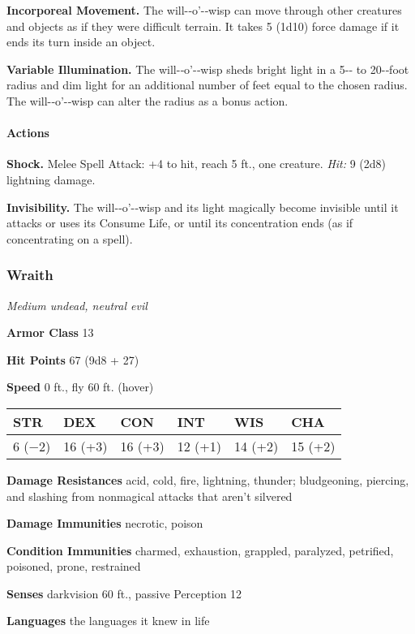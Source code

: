 \documentclass[
]{article}
\begin{document}
\textbf{Incorporeal Movement.} The will-­‐o'-­‐wisp can move through
other creatures and objects as if they were difficult terrain. It takes
5 (1d10) force damage if it ends its turn inside an object.

\textbf{Variable Illumination.} The will-­‐o'-­‐wisp sheds bright light
in a 5-­‐ to 20-­‐foot radius and dim light for an additional number of
feet equal to the chosen radius. The will-­‐o'-­‐wisp can alter the
radius as a bonus action.

\hypertarget{actions-1}{%
\paragraph{Actions}\label{actions-1}}

\textbf{Shock.} Melee Spell Attack: +4 to hit, reach 5 ft., one
creature. \emph{Hit:} 9 (2d8) lightning damage.

\textbf{Invisibility.} The will-­‐o'-­‐wisp and its light magically
become invisible until it attacks or uses its Consume Life, or until its
concentration ends (as if concentrating on a spell).

\hypertarget{wraith}{%
\subsubsection{Wraith}\label{wraith}}

\emph{Medium undead, neutral evil}

\textbf{Armor Class} 13

\textbf{Hit Points} 67 (9d8 + 27)

\textbf{Speed} 0 ft., fly 60 ft. (hover)

\begin{longtable}[]{@{}llllll@{}}
\toprule
STR & DEX & CON & INT & WIS & CHA\tabularnewline
\midrule
\endhead
6 (−2) & 16 (+3) & 16 (+3) & 12 (+1) & 14 (+2) & 15 (+2)\tabularnewline
\bottomrule
\end{longtable}

\textbf{Damage Resistances} acid, cold, fire, lightning, thunder;
bludgeoning, piercing, and slashing from nonmagical attacks that aren't
silvered

\textbf{Damage Immunities} necrotic, poison

\textbf{Condition Immunities} charmed, exhaustion, grappled, paralyzed,
petrified, poisoned, prone, restrained

\textbf{Senses} darkvision 60 ft., passive Perception 12

\textbf{Languages} the languages it knew in life
\end{document}
